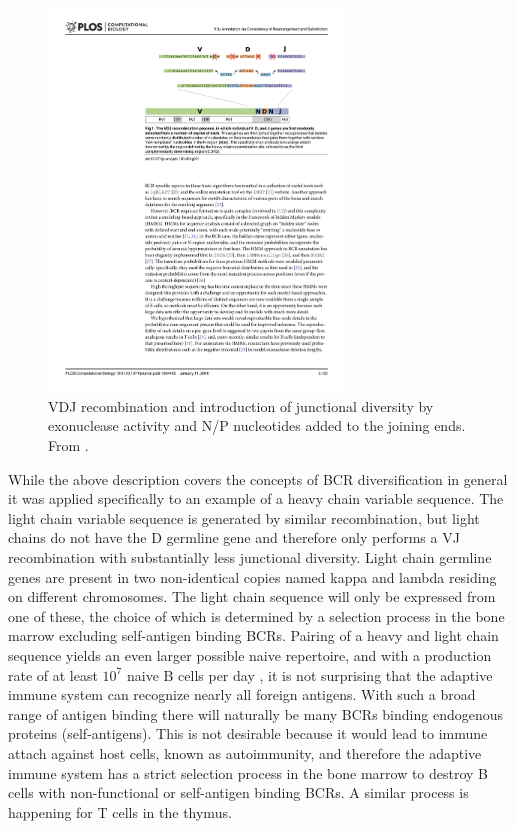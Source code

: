 \begin{figure}
    \centering
    \includegraphics[width=0.7\textwidth]{figures/VDJ_recomb.pdf}
    \caption{
        \label{fig:VDJ_recomb}
        VDJ recombination and introduction of junctional diversity by exonuclease activity and N/P nucleotides added to the joining ends.
        From \cite{ralph2016consistency}.
    }
\end{figure}


While the above description covers the concepts of BCR diversification in general it was applied specifically to an example of a heavy chain variable sequence.
The light chain variable sequence is generated by similar recombination, but light chains do not have the D germline gene and therefore only performs a VJ recombination with substantially less junctional diversity.
Light chain germline genes are present in two non-identical copies named kappa and lambda residing on different chromosomes.
The light chain sequence will only be expressed from one of these, the choice of which is determined by a selection process in the bone marrow excluding self-antigen binding BCRs.
Pairing of a heavy and light chain sequence yields an even larger possible naive repertoire, and with a production rate of at least $10^7$ naive B cells per day \cite{murphy2008immunobiology}, it is not surprising that the adaptive immune system can recognize nearly all foreign antigens.
With such a broad range of antigen binding there will naturally be many BCRs binding endogenous proteins (self-antigens).
This is not desirable because it would lead to immune attach against host cells, known as autoimmunity, and therefore the adaptive immune system has a strict selection process in the bone marrow to destroy B cells with non-functional or self-antigen binding BCRs.
A similar process is happening for T cells in the thymus.




